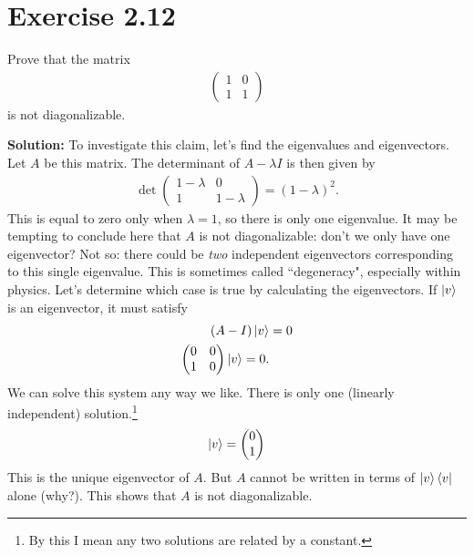 \documentclass{book}
\begin{document}
\section*{Exercise 2.12}
    Prove that the matrix
    \begin{align}
        \begin{pmatrix}
            1 & 0 \\
            1 & 1
        \end{pmatrix}
    \end{align}
    is not diagonalizable.
    
    \textbf{Solution:} To investigate this claim, let's find the eigenvalues and eigenvectors. Let $A$ be this matrix. The determinant of $A - \lambda I$ is then given by
    \begin{align}
        \det \begin{pmatrix}
            1-\lambda & 0 \\
            1 & 1-\lambda 
        \end{pmatrix} = (1-\lambda)^2.
    \end{align}
    This is equal to zero only when $\lambda = 1$, so there is only one eigenvalue. It may be tempting to conclude here that $A$ is not diagonalizable: don't we only have one eigenvector? Not so: there could be \emph{two} independent eigenvectors corresponding to this single eigenvalue. This is sometimes called ``degeneracy", especially within physics. Let's determine which case is true by calculating the eigenvectors. If $\ket{v}$ is an eigenvector, it must satisfy
    \begin{align}
    \begin{aligned}
        (A-I)\ket{v} &= 0 \\
        \begin{pmatrix}
            0 & 0 \\
            1 & 0
        \end{pmatrix} \ket{v} = 0.
    \end{aligned}
    \end{align}
    We can solve this system any way we like. There is only one (linearly independent) solution.\footnote{By this I mean any two solutions are related by a constant.}
    \begin{align}
        \ket{v} = \begin{pmatrix}
            0 \\
            1
        \end{pmatrix}
    \end{align}
    This is the unique eigenvector of $A$. But $A$ cannot be written in terms of $\ket{v}\bra{v}$ alone (why?). This shows that $A$ is not diagonalizable. 
    
\end{document}
